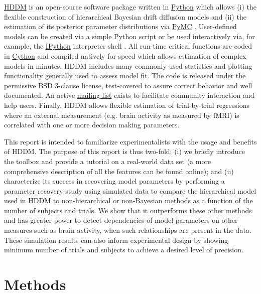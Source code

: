 \documentclass[letterpaper,10pt,english]{article}
\begin{document}
\href{http://ski.clps.brown.edu/hddm_docs/}{HDDM} is an open-source software package written in \href{http://www.python.org/}{Python} which allows (i) the flexible construction of hierarchical Bayesian drift diffusion models and (ii) the estimation of its posterior parameter distributions via \href{http://code.google.com/p/pymc/}{PyMC} \citep{PatilHuardFonnesbeck10}. User-defined models can be created via a simple Python script or be used interactively via, for example, the \href{http://ipython.org}{IPython} interpreter shell \citep{PerezGranger07}. All run-time critical functions are coded in \href{http://www.cython.org/}{Cython} \citep{BehnelBradshawCitroEtAl11} and compiled natively for speed which allows estimation of complex models in minutes. HDDM includes many commonly used statistics and plotting functionality generally used to assess model fit. The code is released under the permissive BSD 3-clause license, test-covered to assure correct behavior and well documented. An active \href{https://groups.google.com/group/hddm-users/}{mailing list} exists to facilitate community interaction and help users. Finally, HDDM allows flexible estimation of trial-by-trial regressions where an external measurement (e.g. brain activity as measured by fMRI) is correlated with one or more decision making parameters.

This report is intended to familiarize experimentalists with the usage
and benefits of HDDM. The purpose of this report is thus two-fold; (i)
we briefly introduce the toolbox and provide a tutorial on a
real-world data set (a more comprehensive description of all the
features can be found online); and (ii) characterize its success in
recovering model parameters by performing a parameter recovery study
using simulated data to compare the hierarchical model used in HDDM to
non-hierarchical or non-Bayesian methods as a function of the number
of subjects and trials. We show that it outperforms these other
methods and has greater power to detect dependencies of model
parameters on other measures such as brain activity, when such
relationships are present in the data. These simulation results can also inform experimental design by showing minimum number of trials and subjects to achieve a desired level of precision.


\section*{Methods}
\label{methods:ipython}\label{methods:index-0}\label{methods::doc}\label{methods:methods}\label{methods:chap-methods}
\end{document}
